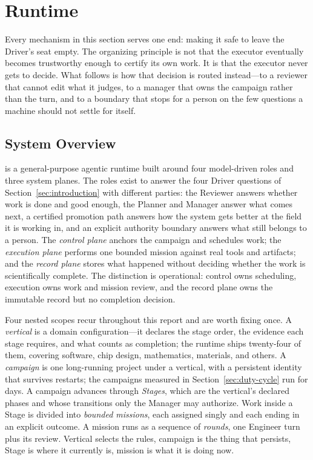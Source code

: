 \section{\systemname Runtime}
\label{sec:method}

Every mechanism in this section serves one end: making it safe to leave the Driver's
seat empty. The organizing principle is not that the executor eventually becomes
trustworthy enough to certify its own work. It is that the executor never gets to
decide. What follows is how that decision is routed instead---to a reviewer that
cannot edit what it judges, to a manager that owns the campaign rather than the turn,
and to a boundary that stops for a person on the few questions a machine should not
settle for itself.

\subsection{System Overview}

\systemname is a general-purpose agentic runtime built around four model-driven roles
and three system planes. The roles exist to answer the four Driver questions of
Section~\ref{sec:introduction} with different parties: the Reviewer answers whether
work is done and good enough, the Planner and Manager answer what comes next, a
certified promotion path answers how the system gets better at the field it is
working in, and an explicit authority boundary answers what still belongs to a
person. The \emph{control plane}
anchors the campaign and schedules work; the \emph{execution plane} performs one
bounded mission against real tools and artifacts; and the \emph{record plane} stores
what happened without deciding whether the work is scientifically complete. The
distinction is operational: control owns scheduling, execution owns work and mission
review, and the record plane owns the immutable record but no completion decision.

Four nested scopes recur throughout this report and are worth fixing once. A
\emph{vertical} is a domain configuration---it declares the stage order, the evidence
each stage requires, and what counts as completion; the runtime ships twenty-four of
them, covering software, chip design, mathematics, materials, and others. A
\emph{campaign} is one long-running project under a vertical, with a persistent
identity that survives restarts; the campaigns measured in
Section~\ref{sec:duty-cycle} run for days. A campaign advances through
\emph{Stages}, which are the vertical's declared phases and whose transitions only
the Manager may authorize. Work inside a Stage is divided into \emph{bounded
missions}, each assigned singly and each ending in an explicit outcome. A mission
runs as a sequence of \emph{rounds}, one Engineer turn plus its review. Vertical
selects the rules, campaign is the thing that persists, Stage is where it currently
is, mission is what it is doing now.

